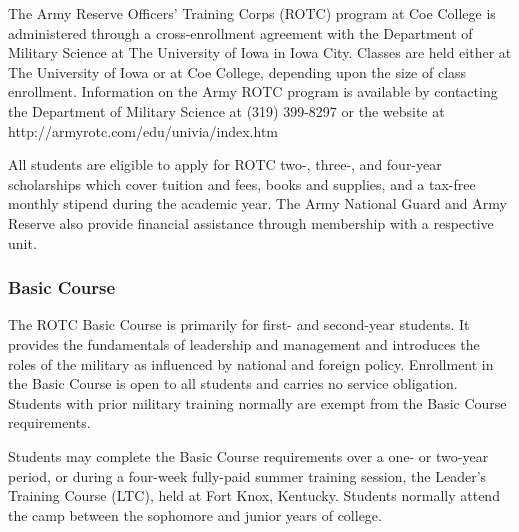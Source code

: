 \documentclass[
  letterpaper,
]{scrbook}
\begin{document}
The Army Reserve Officers' Training Corps (ROTC) program at Coe College
is administered through a cross-enrollment agreement with the Department
of Military Science at The University of Iowa in Iowa City. Classes are
held either at The University of Iowa or at Coe College, depending upon
the size of class enrollment. Information on the Army ROTC program is
available by contacting the Department of Military Science at (319)
399-8297 or the website at http://armyrotc.com/edu/univia/index.htm

All students are eligible to apply for ROTC two-, three-, and four-year
scholarships which cover tuition and fees, books and supplies, and a
tax-free monthly stipend during the academic year. The Army National
Guard and Army Reserve also provide financial assistance through
membership with a respective unit.

\subsubsection{Basic Course}\label{basic-course}

The ROTC Basic Course is primarily for first- and second-year students.
It provides the fundamentals of leadership and management and introduces
the roles of the military as influenced by national and foreign policy.
Enrollment in the Basic Course is open to all students and carries no
service obligation. Students with prior military training normally are
exempt from the Basic Course requirements.

Students may complete the Basic Course requirements over a one- or
two-year period, or during a four-week fully-paid summer training
session, the Leader's Training Course (LTC), held at Fort Knox,
Kentucky. Students normally attend the camp between the sophomore and
junior years of college.
\end{document}
